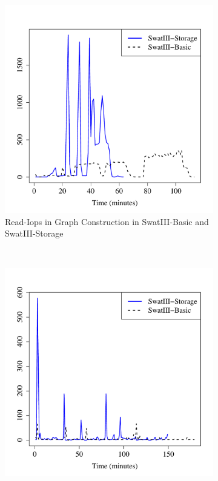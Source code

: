 \documentclass[conference]{IEEEtran}
\begin{document}
\begin{figure}[htb]
        \centering
        \begin{subfigure}[b]{0.3\textwidth}
                \includegraphics[width=\textwidth]{Figure/SystemData/Plots/BGHddSsdRdIops.pdf}
                \caption{Read-Iops in Graph Construction in SwatIII-Basic and SwatIII-Storage}
                \label{fig:BGHddSsdRdIops}
        \end{subfigure}
        ~ %
        \begin{subfigure}[b]{0.3\textwidth}
                \includegraphics[width=\textwidth]{Figure/SystemData/Plots/ECHddSsdRdIops.pdf}

\end{subfigure}
\end{figure}
\end{document}
